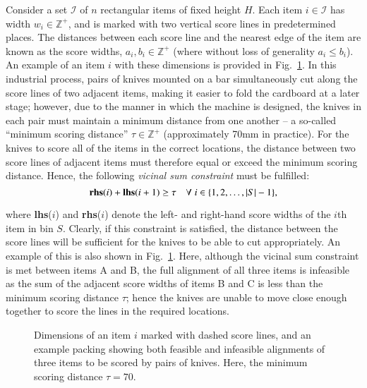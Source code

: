 \documentclass[a4paper,11pt,authoryear]{elsarticle}
\begin{document}

Consider a set $\mathcal{I}$ of $n$ rectangular items of fixed height $H$. Each item $i \in \mathcal{I}$ has width $w_i \in \mathbb{Z}^+$, and is marked with two vertical score lines in predetermined places. The distances between each score line and the nearest edge of the item are known as the score widths, $a_i, b_i \in \mathbb{Z}^+$ (where without loss of generality $a_i \leq b_i$). An example of an item $i$ with these dimensions is provided in Fig.~\ref{fig:itemsdimknives}. In this industrial process, pairs of knives mounted on a bar simultaneously cut along the score lines of two adjacent items, making it easier to fold the cardboard at a later stage; however, due to the manner in which the machine is designed, the knives in each pair must maintain a minimum distance from one another -- a so-called ``minimum scoring distance'' $\tau \in \mathbb{Z}^+$ (approximately 70mm in practice). For the knives to score all of the items in the correct locations, the distance between two score lines of adjacent items must therefore equal or exceed the minimum scoring distance. Hence, the following \emph{vicinal sum constraint} must be fulfilled:
\begin{equation}
	\textbf{rhs}(i) + \textbf{lhs}(i+1) \geq \tau \quad \forall \hspace{1mm} i \in \{1,2,\dotsc,|S|- 1\},
	\label{eqn:vsc}
\end{equation}

\noindent where \textbf{lhs}($i$) and \textbf{rhs}($i$) denote the left- and right-hand score widths of the $i$th item in bin $S$. Clearly, if this constraint is satisfied, the distance between the score lines will be sufficient for the knives to be able to cut appropriately. An example of this is also shown in Fig.~\ref{fig:itemsdimknives}. Here, although the vicinal sum constraint is met between items A and B, the full alignment of all three items is infeasible as the sum of the adjacent score widths of items B and C is less than the minimum scoring distance $\tau$; hence the knives are unable to move close enough together to score the lines in the required locations.

\begin{figure}[H]	
	\centering
	
	\caption{Dimensions of an item $i$ marked with dashed score lines, and an example packing showing both feasible and infeasible alignments of three items to be scored by pairs of knives. Here, the minimum scoring distance $\tau = 70$.}	
	\label{fig:itemsdimknives}
\end{figure}
\end{document}
